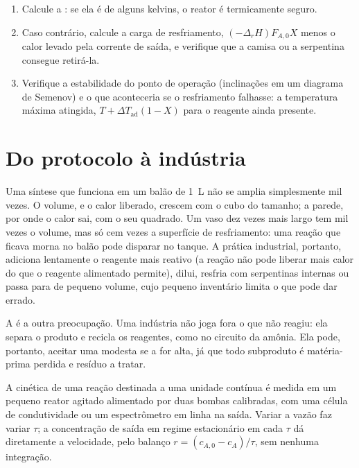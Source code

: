 \begin{method}\label{met:b2:continuous-reactors:heat-balance}
\begin{enumerate}
  \item Calcule a : se ela é de alguns
        kelvins, o reator é termicamente seguro.
  \item Caso contrário, calcule a carga de resfriamento, $(-\Delta_r H)F_{A,0}X$
        menos o calor levado pela corrente de saída, e verifique que a camisa
        ou a serpentina consegue retirá-la.
  \item Verifique a estabilidade do ponto de operação (inclinações em um
        diagrama de Semenov) e o que aconteceria se o resfriamento falhasse:
        a temperatura máxima atingida, $T + \Delta T_{\text{ad}}(1 - X)$ para
        o reagente ainda presente.
\end{enumerate}
\end{method}

\section{Do protocolo à indústria}

Uma síntese que funciona em um balão de \qty{1}{L} não se amplia simplesmente
mil vezes. O volume, e o calor liberado, crescem com o cubo do tamanho; a
parede, por onde o calor sai, com o seu quadrado. Um vaso dez vezes mais
largo tem mil vezes o volume, mas só cem vezes a superfície de
resfriamento: uma reação que ficava morna no balão pode disparar no tanque.
A prática industrial, portanto, adiciona lentamente o reagente mais reativo
(a reação não pode liberar mais calor do que o reagente alimentado permite),
dilui, resfria com serpentinas internas ou passa para 
de pequeno volume, cujo pequeno inventário limita o que pode dar errado.

A  é a outra preocupação. Uma indústria não joga fora o que não
reagiu: ela separa o produto e recicla os reagentes, como no circuito da
amônia. Ela pode, portanto, aceitar uma  modesta se a
 for alta, já que todo subproduto é matéria-prima perdida e
resíduo a tratar.

\begin{inthelab}
A cinética de uma reação destinada a uma unidade contínua é medida em um
pequeno reator agitado alimentado por duas bombas calibradas, com uma célula
de condutividade ou um espectrômetro em linha na saída. Variar a vazão faz
variar $\tau$; a concentração de saída em regime estacionário em cada $\tau$
dá diretamente a velocidade, pelo balanço $r = (c_{A,0} - c_A)/\tau$, sem
nenhuma integração.
\end{inthelab}


